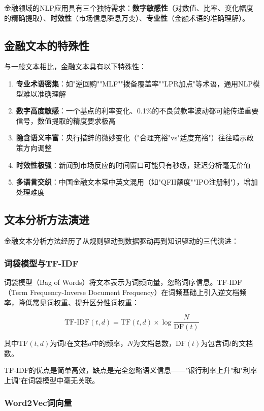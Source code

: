 金融领域的NLP应用具有三个独特需求：\textbf{数字敏感性}（对数值、比率、变化幅度的精确提取）、\textbf{时效性}（市场信息瞬息万变）、\textbf{专业性}（金融术语的准确理解）。

\subsection{金融文本的特殊性}

与一般文本相比，金融文本具有以下特殊性：

\begin{enumerate}[leftmargin=2em]
  \item \textbf{专业术语密集}：如"逆回购""MLF""拨备覆盖率""LPR加点"等术语，通用NLP模型难以准确理解
  \item \textbf{数字高度敏感}：一个基点的利率变化、0.1\%的不良贷款率波动都可能传递重要信号，数值提取的精度要求极高
  \item \textbf{隐含语义丰富}：央行措辞的微妙变化（"合理充裕"vs"适度充裕"）往往暗示政策方向调整
  \item \textbf{时效性极强}：新闻到市场反应的时间窗口可能只有秒级，延迟分析毫无价值
  \item \textbf{多语言交织}：中国金融文本常中英文混用（如"QFII额度""IPO注册制"），增加处理难度
\end{enumerate}

\subsection{文本分析方法演进}

金融文本分析方法经历了从规则驱动到数据驱动再到知识驱动的三代演进：

\subsubsection{词袋模型与TF-IDF}

词袋模型（Bag of Words）将文本表示为词频向量，忽略词序信息。TF-IDF（Term Frequency-Inverse Document Frequency）在词频基础上引入逆文档频率，降低常见词权重、提升区分性词权重：

\[
\text{TF-IDF}(t,d) = \text{TF}(t,d) \times \log\frac{N}{\text{DF}(t)}
\]

其中$\text{TF}(t,d)$为词$t$在文档$d$中的频率，$N$为文档总数，$\text{DF}(t)$为包含词$t$的文档数。

TF-IDF的优点是简单高效，缺点是完全忽略语义信息——"银行利率上升"和"利率上调"在词袋模型中毫无关联。

\subsubsection{Word2Vec词向量}


